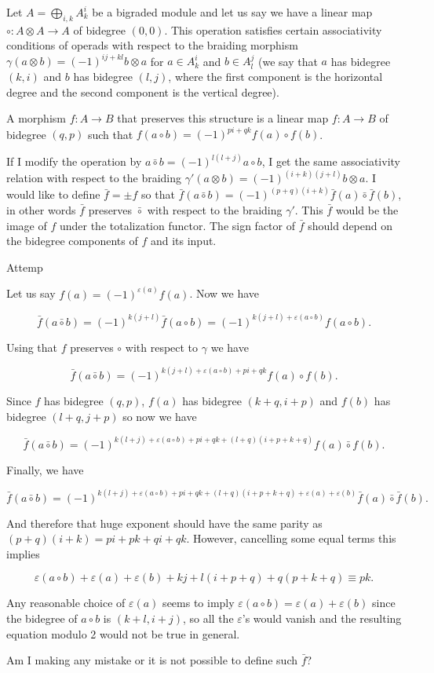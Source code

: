 \documentclass[twoside]{article}
\begin{document}
Let $A=\bigoplus_{i,k} A^i_k$ be a bigraded module and let us say we have a linear map $\circ :A\otimes A\to A$ of bidegree $(0,0)$. This operation satisfies certain associativity conditions of operads with respect to the braiding morphism $\gamma(a\otimes b)=(-1)^{ij+kl}b\otimes a$ for $a\in A^i_k$ and $b\in A^j_l$ (we say that $a$ has bidegree $(k,i)$ and $b$ has bidegree $(l,j)$, where the first component is the horizontal degree and the second component is the vertical degree). 

A morphism $f:A\to B$ that preserves this structure is a linear map $f:A\to B$ of bidegree $(q,p)$ such that $f(a\circ b)=(-1)^{pi+qk}f(a)\circ f(b)$.



If I modify the operation by $a\bar{\circ}b=(-1)^{l(l+j)}a\circ b$, I get the same associativity relation with respect to the braiding $\gamma'(a\otimes b)=(-1)^{(i+k)(j+l)}b\otimes a$. I would like to define $\bar{f}=\pm f$ so that $\bar{f}(a\bar{\circ}b)=(-1)^{(p+q)(i+k)}\bar{f}(a)\bar{\circ}\bar{f}(b)$, in other words $\bar{f}$ preserves $\bar{\circ}$ with respect to the braiding $\gamma'$. This $\bar{f}$ would be the image of $f$ under the totalization functor. The sign factor of $\bar{f}$ should depend on the bidegree components of $f$ and its input.


Attemp

Let us say $f(a)=(-1)^{\varepsilon(a)}f(a)$. Now we have

$$\bar{f}(a\bar{\circ} b)=(-1)^{k(j+l)}\bar{f}(a\circ b)=(-1)^{k(j+l)+\varepsilon(a\circ b)}f(a\circ b).$$

Using that $f$ preserves $\circ$ with respect to $\gamma$ we have

$$\bar{f}(a\bar{\circ} b)=(-1)^{k(j+l)+\varepsilon(a\circ b)+pi+qk}f(a)\circ f(b).$$

Since $f$ has bidegree $(q,p)$, $f(a)$ has bidegree $(k+q,i+p)$ and $f(b)$ has bidegree $(l+q,j+p)$ so now we have

$$\bar{f}(a\bar{\circ} b)=(-1)^{k(l+j)+\varepsilon(a\circ b)+pi+qk+(l+q)(i+p+k+q)}f(a)\bar{\circ} f(b).$$

Finally, we have 

$$\bar{f}(a\bar{\circ} b)=(-1)^{k(l+j)+\varepsilon(a\circ b)+pi+qk+(l+q)(i+p+k+q)+\varepsilon(a)+\varepsilon(b)}\bar{f}(a)\bar{\circ} \bar{f}(b).$$

And therefore that huge exponent should have the same parity as $(p+q)(i+k)=pi+pk+qi+qk$. However, cancelling some equal terms this implies

$$\varepsilon(a\circ b)+\varepsilon(a)+\varepsilon(b)+kj+l(i+p+q)+q(p+k+q)\equiv pk.$$

Any reasonable choice of $\varepsilon(a)$ seems to imply $\varepsilon(a\circ b)=\varepsilon(a)+\varepsilon(b)$ since the bidegree of $a\circ b$ is $(k+l,i+j)$, so all the $\varepsilon$'s would vanish and the resulting equation modulo 2 would not be true in general.

Am I making any mistake or it is not possible to define such $\bar{f}$?
\end{document}
